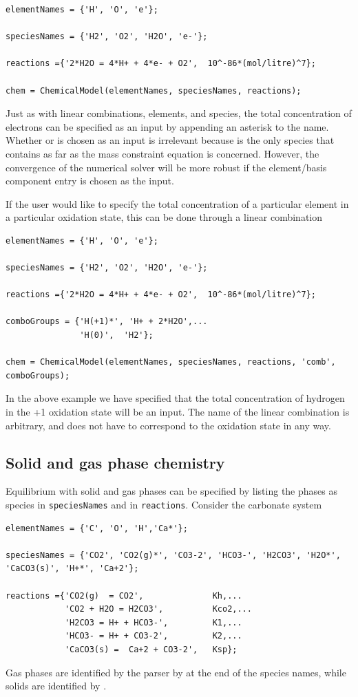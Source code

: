 \documentclass{article}
\begin{document}
\begin{lstlisting}
elementNames = {'H', 'O', 'e'};

speciesNames = {'H2', 'O2', 'H2O', 'e-'};

reactions ={'2*H2O = 4*H+ + 4*e- + O2',  10^-86*(mol/litre)^7};

chem = ChemicalModel(elementNames, speciesNames, reactions);
\end{lstlisting}
Just as with linear combinations, elements, and species, the total concentration of electrons can be specified as an input by appending an asterisk to the name. Whether  or  is chosen as an input is irrelevant because  is the only species that contains  as far as the mass constraint equation is concerned. However, the convergence of the numerical solver will be more robust if the element/basis component entry is chosen as the input. 

If the user would like to specify the total concentration of a particular element in a particular oxidation state, this can be done through a linear combination

\begin{lstlisting}
elementNames = {'H', 'O', 'e'};

speciesNames = {'H2', 'O2', 'H2O', 'e-'};

reactions ={'2*H2O = 4*H+ + 4*e- + O2',  10^-86*(mol/litre)^7};

comboGroups = {'H(+1)*', 'H+ + 2*H2O',...
               'H(0)',  'H2'};

chem = ChemicalModel(elementNames, speciesNames, reactions, 'comb', comboGroups);
\end{lstlisting}
In the above example we have specified that the total concentration of hydrogen in the +1 oxidation state will be an input. The name of the linear combination is arbitrary, and does not have to correspond to the oxidation state in any way. 


\subsection{Solid and gas phase chemistry}

Equilibrium with solid and gas phases can be specified by listing the phases as species in \verb|speciesNames| and in \verb|reactions|. Consider the carbonate system

\begin{lstlisting}
elementNames = {'C', 'O', 'H','Ca*'};

speciesNames = {'CO2', 'CO2(g)*', 'CO3-2', 'HCO3-', 'H2CO3', 'H2O*', 'CaCO3(s)', 'H+*', 'Ca+2'};

reactions ={'CO2(g)  = CO2',              Kh,...
            'CO2 + H2O = H2CO3',          Kco2,...
            'H2CO3 = H+ + HCO3-',         K1,...
            'HCO3- = H+ + CO3-2',         K2,...
            'CaCO3(s) =  Ca+2 + CO3-2',   Ksp};   
\end{lstlisting}
Gas phases are identified by the parser by  at the end of the species names, while solids are identified by . 
\end{document}
